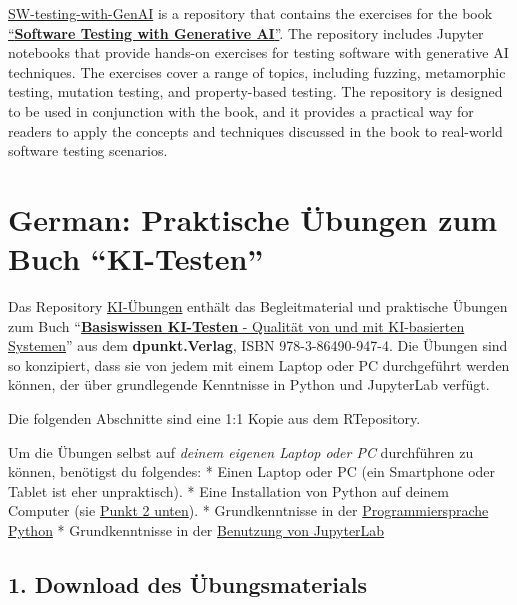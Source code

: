 \documentclass[
  letterpaper,
  DIV=11,
  numbers=noendperiod,
  oneside]{scrreprt}
\begin{document}
\begin{tcolorbox}
\href{https://github.com/mwinteringham/generative-ai-and-testing}{SW-testing-with-GenAI}
is a repository that contains the exercises for the book
\href{https://www.manning.com/books/software-testing-with-generative-ai}{``\textbf{Software
Testing with Generative AI}''}. The repository includes Jupyter
notebooks that provide hands-on exercises for testing software with
generative AI techniques. The exercises cover a range of topics,
including fuzzing, metamorphic testing, mutation testing, and
property-based testing. The repository is designed to be used in
conjunction with the book, and it provides a practical way for readers
to apply the concepts and techniques discussed in the book to real-world
software testing scenarios.

\chapter*{German: Praktische Übungen zum Buch
``KI-Testen''}\label{german-praktische-uxfcbungen-zum-buch-ki-testen}


Das Repository
\href{https://github.com/KI-Testen/Uebungen/tree/main}{KI-Übungen}
enthält das Begleitmaterial und praktische Übungen zum Buch
``\href{https://dpunkt.de/produkt/basiswissen-ki-testen/}{\textbf{Basiswissen
KI-Testen} - Qualität von und mit KI-basierten Systemen}'' aus dem
\textbf{dpunkt.Verlag}, ISBN 978-3-86490-947-4. Die Übungen sind so
konzipiert, dass sie von jedem mit einem Laptop oder PC durchgeführt
werden können, der über grundlegende Kenntnisse in Python und JupyterLab
verfügt.

Die folgenden Abschnitte sind eine 1:1 Kopie aus dem RTepository.

Um die Übungen selbst auf \emph{deinem eigenen Laptop oder PC}
durchführen zu können, benötigst du folgendes: * Einen Laptop oder PC
(ein Smartphone oder Tablet ist eher unpraktisch). * Eine Installation
von Python auf deinem Computer (sie
\hyperref[2.-Installation-von-python]{Punkt 2 unten}). * Grundkenntnisse
in der
\href{https://tutorial.djangogirls.org/de/python_introduction}{Programmiersprache
Python} * Grundkenntnisse in der
\href{https://jupyter-tutorial.readthedocs.io/de/latest/index.html}{Benutzung
von JupyterLab}

\section*{1. Download des
Übungsmaterials}\label{download-des-uxfcbungsmaterials}


\end{tcolorbox}
\end{document}
